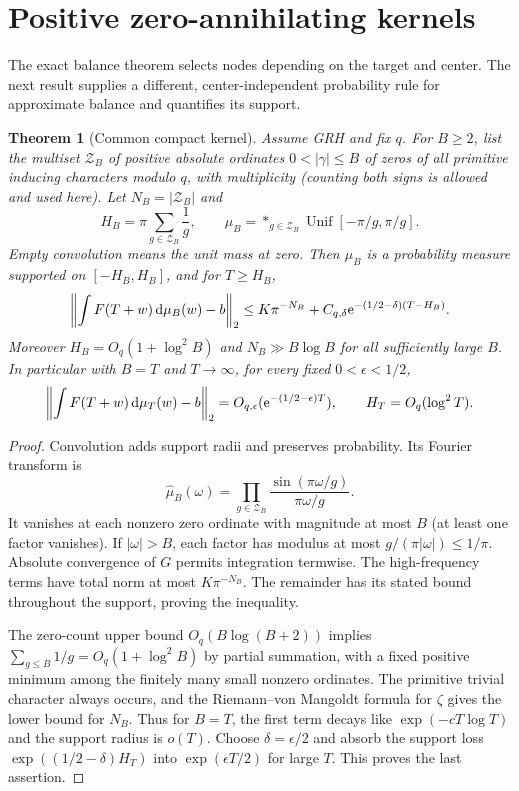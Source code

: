 \documentclass[11pt]{article}
\newtheorem{theorem}{Theorem}[section]
\theoremstyle{remark}\newtheorem{remark}[theorem]{Remark}
\begin{document}
\section{Positive zero-annihilating kernels}
The exact balance theorem selects nodes depending on the target and center. The next result supplies a different, center-independent probability rule for approximate balance and quantifies its support.
\begin{theorem}[Common compact kernel]\label{thm:kernel}
Assume GRH and fix $q$. For $B\ge2$, list the multiset $\mathcal Z_B$ of positive absolute ordinates $0<|\gamma|\le B$ of zeros of all primitive inducing characters modulo $q$, with multiplicity (counting both signs is allowed and used here). Let $N_B=|\mathcal Z_B|$ and
\[
 H_B=\pi\sum_{g\in\mathcal Z_B}\frac1g,\qquad
 \mu_B=*_{g\in\mathcal Z_B}\operatorname{Unif}[-\pi/g,\pi/g].
\]
Empty convolution means the unit mass at zero. Then $\mu_B$ is a probability measure supported on $[-H_B,H_B]$, and for $T\ge H_B$,
\[
 \left\|\int F(T+w)\,\mathrm d\mu_B(w)-b\right\|_2
 \le K\pi^{-N_B}+C_{q,\delta}\mathrm e^{-(1/2-\delta)(T-H_B)}.
\]
Moreover $H_B=O_q(1+\log^2 B)$ and $N_B\gg B\log B$ for all sufficiently large $B$. In particular with $B=T$ and $T\to\infty$, for every fixed $0<\epsilon<1/2$,
\[
 \left\|\int F(T+w)\,\mathrm d\mu_T(w)-b\right\|_2
   =O_{q,\epsilon}(\mathrm e^{-(1/2-\epsilon)T}),\qquad
 H_T=O_q(\log^2 T).
\]
\end{theorem}
\begin{proof}
Convolution adds support radii and preserves probability. Its Fourier transform is
\[
 \widehat\mu_B(\omega)=\prod_{g\in\mathcal Z_B}
       \frac{\sin(\pi\omega/g)}{\pi\omega/g}.
\]
It vanishes at each nonzero zero ordinate with magnitude at most $B$ (at least one factor vanishes). If $|\omega|>B$, each factor has modulus at most $g/(\pi|\omega|)\le1/\pi$. Absolute convergence of $G$ permits integration termwise. The high-frequency terms have total norm at most $K\pi^{-N_B}$. The remainder has its stated bound throughout the support, proving the inequality.

The zero-count upper bound $O_q(B\log(B+2))$ implies $\sum_{g\le B}1/g=O_q(1+\log^2 B)$ by partial summation, with a fixed positive minimum among the finitely many small nonzero ordinates. The primitive trivial character always occurs, and the Riemann--von Mangoldt formula for $\zeta$ gives the lower bound for $N_B$. Thus for $B=T$, the first term decays like $\exp(-cT\log T)$ and the support radius is $o(T)$. Choose $\delta=\epsilon/2$ and absorb the support loss $\exp((1/2-\delta)H_T)$ into $\exp(\epsilon T/2)$ for large $T$. This proves the last assertion.
\end{proof}
\end{document}
